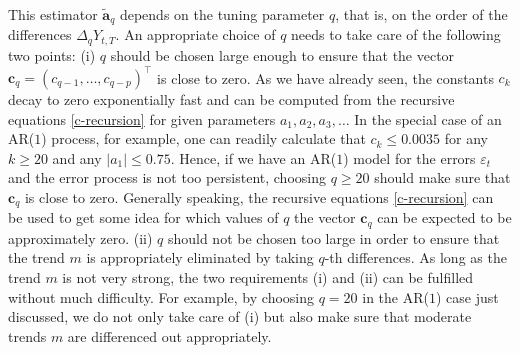 \documentclass[a4paper]{scrartcl}
\begin{document}
This estimator $\widetilde{\boldsymbol{a}}_q$ depends on the tuning parameter $q$, that is, on the order of the differences $\Delta_q Y_{t,T}$. An appropriate choice of $q$ needs to take care of the following two points: 
(i) $q$ should be chosen large enough to ensure that the vector $\boldsymbol{c}_q = (c_{q-1},\dots,c_{q-p})^\top$ is close to zero. As we have already seen, the constants $c_k$ decay to zero exponentially fast and can be computed from the recursive equations \eqref{c-recursion} for given parameters $a_1,a_2,a_3,\ldots$ In the special case of an AR($1$) process, for example, one can readily calculate that $c_k \le 0.0035$ for any $k \ge 20$ and any $|a_1| \le 0.75$. Hence, if we have an AR($1$) model for the errors $\varepsilon_t$ and the error process is not too persistent, choosing $q \ge 20$ should make sure that $\boldsymbol{c}_q$ is close to zero. Generally speaking, the recursive equations \eqref{c-recursion} can be used to get some idea for which values of $q$ the vector $\boldsymbol{c}_q$ can be expected to be approximately zero. 
(ii) $q$ should not be chosen too large in order to ensure that the trend $m$ is appropriately eliminated by taking $q$-th differences. As long as the trend $m$ is not very strong, the two requirements (i) and (ii) can be fulfilled without much difficulty. For example, by choosing $q = 20$ in the AR($1$) case just discussed, we do not only take care of (i) but also make sure that moderate trends $m$ are differenced out appropriately. 
\end{document}
